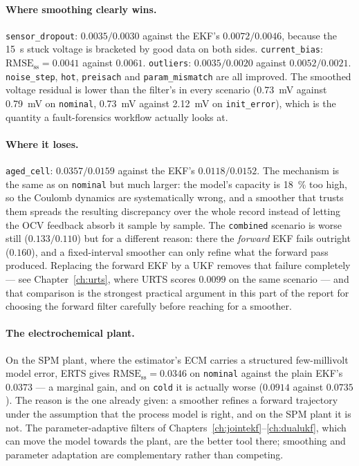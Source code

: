 \paragraph{Where smoothing clearly wins.}  \texttt{sensor\_dropout}: $0.0035/0.0030$ against the
EKF's $0.0072/0.0046$, because the \SI{15}{\second} stuck voltage is bracketed by good data on both
sides.  \texttt{current\_bias}: $\text{RMSE}_\text{ss}=0.0041$ against $0.0061$.
\texttt{outliers}: $0.0035/0.0020$ against $0.0052/0.0021$.  \texttt{noise\_step}, \texttt{hot},
\texttt{preisach} and \texttt{param\_mismatch} are all improved.  The smoothed voltage residual is
lower than the filter's in every scenario (\SI{0.73}{\milli\volt} against \SI{0.79}{\milli\volt} on
\texttt{nominal}, \SI{0.73}{\milli\volt} against \SI{2.12}{\milli\volt} on \texttt{init\_error}),
which is the quantity a fault-forensics workflow actually looks at.

\paragraph{Where it loses.}  \texttt{aged\_cell}: $0.0357/0.0159$ against the EKF's
$0.0118/0.0152$.  The mechanism is the same as on \texttt{nominal} but much larger: the model's
capacity is \SI{18}{\percent} too high, so the Coulomb dynamics are systematically wrong, and a
smoother that trusts them spreads the resulting discrepancy over the whole record instead of letting
the OCV feedback absorb it sample by sample.  The \texttt{combined} scenario is worse still
($0.133/0.110$) but for a different reason: there the \emph{forward} EKF fails outright ($0.160$),
and a fixed-interval smoother can only refine what the forward pass produced.  Replacing the forward
EKF by a UKF removes that failure completely --- see Chapter~\ref{ch:urts}, where URTS scores
$0.0099$ on the same scenario --- and that comparison is the strongest practical argument in this
part of the report for choosing the forward filter carefully before reaching for a smoother.

\paragraph{The electrochemical plant.}  On the SPM plant, where the estimator's ECM carries a
structured few-millivolt model error, ERTS gives $\text{RMSE}_\text{ss}=0.0346$ on \texttt{nominal}
against the plain EKF's $0.0373$ --- a marginal gain, and on \texttt{cold} it is actually worse
($0.0914$ against $0.0735$).  The reason is the one already given: a smoother refines a forward
trajectory under the assumption that the process model is right, and on the SPM plant it is not.
The parameter-adaptive filters of Chapters~\ref{ch:jointekf}--\ref{ch:dualukf}, which can move the
model towards the plant, are the better tool there; smoothing and parameter adaptation are
complementary rather than competing.


